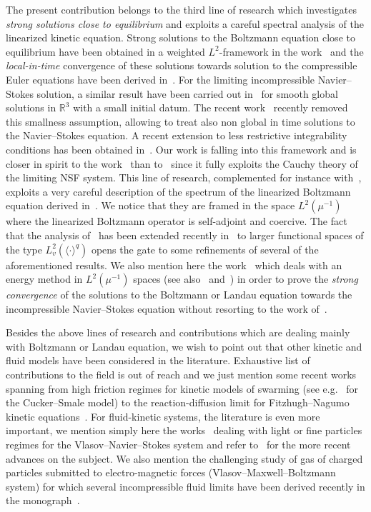 \documentclass[10pt]{amsart}
\theoremstyle{definition}\newtheorem{defi}[theo]{Definition}\newtheorem{rema}[theo]{Remark}\newtheorem{exam}[theo]{Example}\newtheorem{exem}[theo]{Example}\newtheorem{nota}[theo]{Notation}
\newcommand{\R}{\mathbb{R}}
\begin{document}
The present contribution belongs to the third line of research which investigates \emph{strong solutions close to equilibrium} and exploits a careful spectral analysis of the linearized kinetic equation. Strong solutions to the Boltzmann equation close to equilibrium have been obtained in a weighted $L^{2}$-framework in the work~\cite{U1974} and the \emph{local-in-time} convergence of these solutions towards solution to the compressible Euler equations have been derived in~\cite{nishida}. For the limiting incompressible Navier--Stokes solution, a similar result have been carried out in~\cite{BU1991} for smooth global solutions in $\R^{3}$ with a small {initial datum}. The recent work~\cite{GT2020} recently removed this smallness assumption, allowing to treat also non global in time solutions to the Navier--Stokes equation. A recent extension to less restrictive integrability conditions has been obtained in~\cite{G2023}. Our work is falling into this framework and is closer in spirit to the work~\cite{GT2020} than to~\cite{BU1991} since it fully exploits the Cauchy theory of the limiting NSF system. This line of research, complemented for instance with~\cite{B2015,BMM2019, CC2023}, exploits a very careful description of the spectrum of the linearized Boltzmann equation derived in~\cite{EP1975}. We notice that they are framed in the space $L^{2}(\mu^{-1})$ where the linearized Boltzmann operator is self-adjoint and coercive. The fact that the analysis of~\cite{EP1975} has been extended recently in~\cite{G2021} to larger functional spaces of the type $L^{2}_{v}(\langle \cdot\rangle^{q})$ opens the gate to some refinements of several of the aforementioned results. We also mention here the work~\cite{zhao} which deals with an energy method in $L^{2}(\mu^{-1})$ spaces (see also~\cite{guo,guo2} and~\cite{R2021}) in order to prove the \emph{strong convergence} of the solutions to the Boltzmann or Landau equation towards the incompressible Navier--Stokes equation without resorting to the work of~\cite{EP1975}.

Besides the above lines of research and contributions which are dealing mainly with Boltzmann or Landau equation, we wish to point out that other kinetic and fluid models have been considered in the literature. Exhaustive list of contributions to the field is out of reach and we just mention some recent works spanning from high friction regimes for kinetic models of swarming (see e.g.~\cite{figalli,karper} for the Cucker--Smale model) to the reaction-diffusion limit for Fitzhugh--Nagumo kinetic equations~\cite{crevat}. For fluid-kinetic systems, the literature is even more important, we mention simply here the works~\cite{goudona,goudonb} dealing with light or fine particles regimes for the Vlasov--Navier--Stokes system and refer to~\cite{daniel} for the more recent advances on the subject. We also mention the challenging study of gas of charged particles submitted to electro-magnetic forces (Vlasov--Maxwell--Boltzmann system) for which several incompressible fluid limits have been derived recently in the monograph~\cite{arsenio}.
\end{document}
